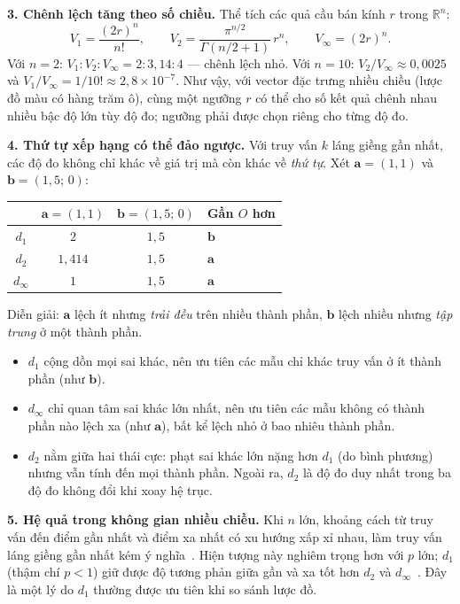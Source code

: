 \textbf{3. Chênh lệch tăng theo số chiều.} Thể tích các quả cầu bán kính $r$ trong $\mathbb{R}^n$:
\begin{equation}
V_1 = \frac{(2r)^n}{n!}, \qquad V_2 = \frac{\pi^{n/2}}{\Gamma(n/2 + 1)}\, r^n, \qquad V_\infty = (2r)^n.
\end{equation}
Với $n = 2$: $V_1 : V_2 : V_\infty = 2 : 3{,}14 : 4$ — chênh lệch nhỏ. Với $n = 10$: $V_2 / V_\infty \approx 0{,}0025$ và $V_1 / V_\infty = 1/10! \approx 2{,}8 \times 10^{-7}$. Như vậy, với vector đặc trưng nhiều chiều (lược đồ màu có hàng trăm ô), cùng một ngưỡng $r$ có thể cho số kết quả chênh nhau nhiều bậc độ lớn tùy độ đo; ngưỡng phải được chọn riêng cho từng độ đo.

\textbf{4. Thứ tự xếp hạng có thể đảo ngược.} Với truy vấn $k$ láng giềng gần nhất, các độ đo không chỉ khác về giá trị mà còn khác về \emph{thứ tự}. Xét $\mathbf{a} = (1, 1)$ và $\mathbf{b} = (1{,}5;\, 0)$:
\begin{center}
\begin{tabular}{|c|c|c|l|}
\hline
 & $\mathbf{a} = (1, 1)$ & $\mathbf{b} = (1{,}5;\, 0)$ & \textbf{Gần $O$ hơn} \\
\hline
$d_1$ & $2$ & $1{,}5$ & $\mathbf{b}$ \\
$d_2$ & $1{,}414$ & $1{,}5$ & $\mathbf{a}$ \\
$d_\infty$ & $1$ & $1{,}5$ & $\mathbf{a}$ \\
\hline
\end{tabular}
\end{center}
Diễn giải: $\mathbf{a}$ lệch ít nhưng \emph{trải đều} trên nhiều thành phần, $\mathbf{b}$ lệch nhiều nhưng \emph{tập trung} ở một thành phần.
\begin{itemize}
    \item $d_1$ cộng dồn mọi sai khác, nên ưu tiên các mẫu chỉ khác truy vấn ở ít thành phần (như $\mathbf{b}$).
    \item $d_\infty$ chỉ quan tâm sai khác lớn nhất, nên ưu tiên các mẫu không có thành phần nào lệch xa (như $\mathbf{a}$), bất kể lệch nhỏ ở bao nhiêu thành phần.
    \item $d_2$ nằm giữa hai thái cực: phạt sai khác lớn nặng hơn $d_1$ (do bình phương) nhưng vẫn tính đến mọi thành phần. Ngoài ra, $d_2$ là độ đo duy nhất trong ba độ đo không đổi khi xoay hệ trục.
\end{itemize}

\textbf{5. Hệ quả trong không gian nhiều chiều.} Khi $n$ lớn, khoảng cách từ truy vấn đến điểm gần nhất và điểm xa nhất có xu hướng xấp xỉ nhau, làm truy vấn láng giềng gần nhất kém ý nghĩa~\citep{beyer1999nearest}. Hiện tượng này nghiêm trọng hơn với $p$ lớn; $d_1$ (thậm chí $p < 1$) giữ được độ tương phản giữa gần và xa tốt hơn $d_2$ và $d_\infty$~\citep{aggarwal2001surprising}. Đây là một lý do $d_1$ thường được ưu tiên khi so sánh lược đồ.

